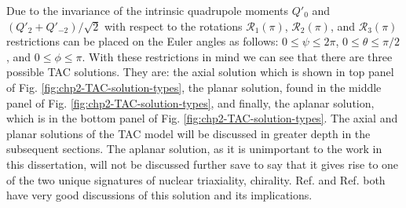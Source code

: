 Due to the invariance of the intrinsic quadrupole moments $Q'_0$ and $(Q'_2+Q'_{-2})/\sqrt{2}$ with respect to the rotations $\mathscr{R}_1(\pi)$, $\mathscr{R}_2(\pi)$, and $\mathscr{R}_3(\pi)$ restrictions can be placed on the Euler angles as follows: $0\leq\psi\leq{}2\pi$, $0\leq\theta\leq\pi/2$, and $0\leq\phi\leq\pi$. With these restrictions in mind we can see that there are three possible TAC solutions. They are: the axial solution which is shown in top panel of Fig. \ref{fig:chp2-TAC-solution-types}, the planar solution, found in the middle panel of Fig. \ref{fig:chp2-TAC-solution-types}, and finally, the aplanar solution, which is in the bottom panel of Fig. \ref{fig:chp2-TAC-solution-types}. The axial and planar solutions of the TAC model will be discussed in greater depth in the subsequent sections. The aplanar solution, as it is unimportant to the work in this dissertation, will not be discussed further save to say that it gives rise to one of the two unique signatures of nuclear triaxiality, chirality. Ref. \cite{frauendorfTAC} and Ref. \cite{frauendorfChirality} both have very good discussions of this solution and its implications.
